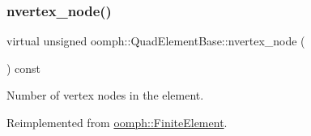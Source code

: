 \subsubsection{\texorpdfstring{nvertex\+\_\+node()}{nvertex\_node()}}
{\footnotesize\ttfamily virtual unsigned oomph\+::\+Quad\+Element\+Base\+::nvertex\+\_\+node (\begin{DoxyParamCaption}{ }\end{DoxyParamCaption}) const\hspace{0.3cm}{\ttfamily [pure virtual]}}



Number of vertex nodes in the element. 



Reimplemented from \hyperlink{classoomph_1_1FiniteElement_a45631a7aa50efc3123a921d114f84cba}{oomph\+::\+Finite\+Element}.



